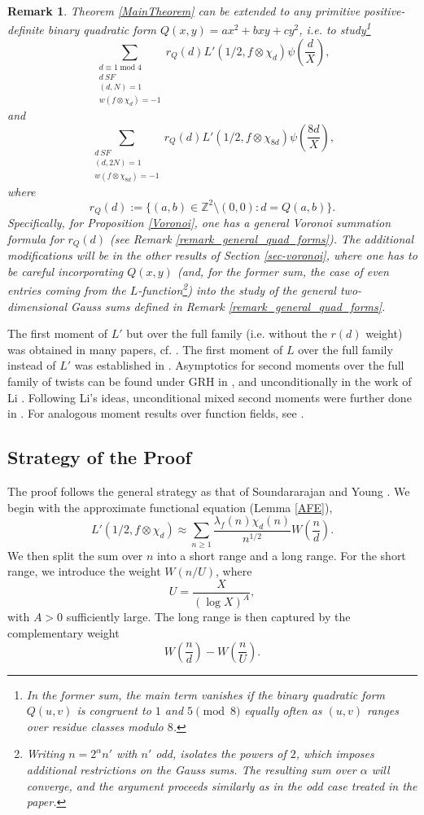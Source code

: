 \documentclass[12pt]{amsart}
\def\Z{\mathbb{Z}}
\newtheorem{remark}[theorem]{Remark}
\def\Z{\mathbb Z}
\def\Z{\mathbb Z}
\def\mod{\operatorname{mod}}
\def\log{\operatorname{log}}
\begin{document}
\begin{remark}
    Theorem \ref{MainTheorem} can be extended to any primitive positive-definite binary quadratic form $Q(x,y)=ax^2+bxy+cy^2$, %
    i.e. to study\footnote{In the former sum, the main term vanishes if the binary quadratic form $Q(u,v)$ is congruent to $1$ and $5 \pmod{8}$ equally often as $(u,v)$ ranges over residue classes modulo $8$.}
    $$ \sum_{\substack{d\equiv 1 \mod 4 \\ d \ SF\\(d,N)=1 \\w(f\otimes\chi_{d})=-1}}r_Q(d)L'(1/2,f\otimes\chi_{d})\psi\left(\frac{d}{X}\right), $$
    and
    $$ \sum_{\substack{ d \ SF\\(d,2N)=1 \\w(f\otimes\chi_{8d})=-1}}r_Q(d)L'(1/2,f\otimes\chi_{8d})\psi\left(\frac{8d}{X}\right), $$
    where
    $$ r_Q(d) := \{ (a,b)\in \Z^2 \setminus (0,0) : d=Q(a,b) \} .$$
    Specifically, for Proposition \ref{Voronoi}, one has a general Voronoi summation formula for $r_Q(d)$ (see Remark \ref{remark_general_quad_forms}). The additional modifications will be in the other results of Section \ref{sec-voronoi}, where one has to be careful incorporating $Q(x,y)$ (and, for the former sum, the case of even entries coming from the $L$-function\footnote{Writing $n=2^{\alpha}n'$ with $n'$ odd, isolates the powers of $2$, which imposes additional restrictions on the Gauss sums. The resulting sum over $\alpha$ will converge, and the argument proceeds similarly as in the odd case treated in the paper.}) into the study of the general two-dimensional Gauss sums defined in Remark \ref{remark_general_quad_forms}.
    
\end{remark}

The first moment of $L'$ but over the full family (i.e. without the $r(d)$ weight) was obtained in many papers, cf. \cite{MurtyMurty,iwaniec}. The first moment of $L$ over the full family instead of $L'$ was established in \cite{iwaniec, radzsound, shen22}. Asymptotics for second moments over the full family of twists can be found under GRH in \cite{soundyoung, Petrow}, and unconditionally in the work of Li \cite{XLi}. Following Li's ideas, unconditional mixed second moments were further done in \cite{Kumar,zhou, huang2025averagingquadraticallytwistedlvalues, chen26}. For analogous moment results over function fields, see \cite{florea}. 

\subsection{Strategy of the Proof}
The proof follows the general strategy as that of Soundararajan and Young \cite{soundyoung}. We begin with the approximate functional equation (Lemma \ref{AFE}),
$$
L'(1/2,f\otimes \chi_d)
\approx
\sum_{n\ge 1}\frac{\lambda_f(n)\chi_d(n)}{n^{1/2}}
W\left(\frac{n}{d}\right).
$$
We then split the sum over $n$ into a short range and a long range. For the short range, we introduce the weight $W(n/U)$, where
$$
U=\frac{X}{(\log X)^A},
$$
with $A>0$ sufficiently large. The long range is then captured by the complementary weight
$$
W\left(\frac{n}{d}\right)-W\left(\frac{n}{U}\right).
$$
\end{document}

